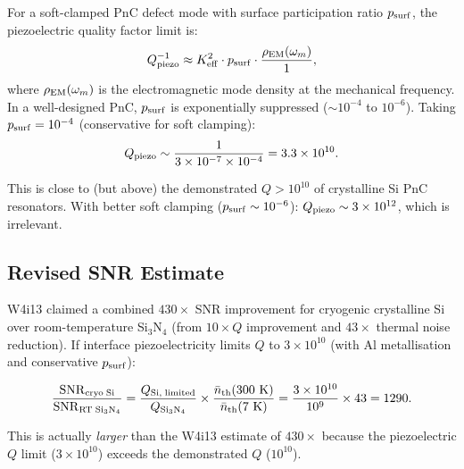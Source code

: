 \documentclass[11pt]{article}
\theoremstyle{definition}
\theoremstyle{remark}
\newcommand{\ee}[1]{\times 10^{#1}}
\newcommand{\SNR}{\mathrm{SNR}}
\begin{document}
For a soft-clamped PnC defect mode with surface participation ratio
$p_{\rm surf}$, the piezoelectric quality factor limit is:
\begin{equation}
Q_{\rm piezo}^{-1} \approx K^2_{\rm eff} \cdot p_{\rm surf}
\cdot \frac{\rho_{\rm EM}(\omega_m)}{1},
\label{eq:q_piezo}
\end{equation}
where $\rho_{\rm EM}(\omega_m)$ is the electromagnetic mode density
at the mechanical frequency. In a well-designed PnC, $p_{\rm surf}$
is exponentially suppressed ($\sim 10^{-4}$ to $10^{-6}$). Taking
$p_{\rm surf} = 10^{-4}$ (conservative for soft clamping):
\begin{equation}
Q_{\rm piezo} \sim \frac{1}{3\ee{-7} \times 10^{-4}}
= 3.3\ee{10}.
\label{eq:q_piezo_num}
\end{equation}

This is close to (but above) the demonstrated $Q > 10^{10}$ of
crystalline Si PnC resonators. With better soft clamping
($p_{\rm surf} \sim 10^{-6}$): $Q_{\rm piezo} \sim 3\ee{12}$,
which is irrelevant.

\subsection{Revised SNR Estimate}

W4i13 claimed a combined $430\times$ SNR improvement for cryogenic
crystalline Si over room-temperature Si$_3$N$_4$ (from $10\times Q$
improvement and $43\times$ thermal noise reduction). If interface
piezoelectricity limits $Q$ to $3\ee{10}$ (with Al metallisation
and conservative $p_{\rm surf}$):

\begin{equation}
\frac{\SNR_{\rm cryo\;Si}}{\SNR_{\rm RT\;Si_3N_4}}
= \frac{Q_{\rm Si,\;limited}}{Q_{\rm Si_3N_4}} \times
\frac{\bar{n}_{\rm th}(300~{\rm K})}{\bar{n}_{\rm th}(7~{\rm K})}
= \frac{3\ee{10}}{10^9} \times 43
= 1290.
\label{eq:snr_revised}
\end{equation}

This is actually \textit{larger} than the W4i13 estimate of $430\times$
because the piezoelectric $Q$ limit ($3\ee{10}$) exceeds the
demonstrated $Q$ ($10^{10}$).
\end{document}
